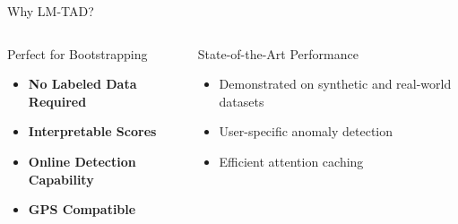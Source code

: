 \documentclass[aspectratio=169,xcolor={dvipsnames}]{beamer}
\begin{document}
\begin{frame}{Why LM-TAD?}
  \begin{columns}
    \begin{column}{0.5\textwidth}
      \begin{block}{Perfect for Bootstrapping}
        \begin{itemize}
          \item \textbf{No Labeled Data Required}
          \item \textbf{Interpretable Scores}
          \item \textbf{Online Detection Capability}
          \item \textbf{GPS Compatible}
        \end{itemize}
      \end{block}
    \end{column}
    \begin{column}{0.5\textwidth}
      \begin{alertblock}{State-of-the-Art Performance}
        \begin{itemize}
          \item Demonstrated on synthetic and real-world datasets
          \item User-specific anomaly detection
          \item Efficient attention caching
        \end{itemize}
      \end{alertblock}
    \end{column}
  \end{columns}
\end{frame}
\end{document}
